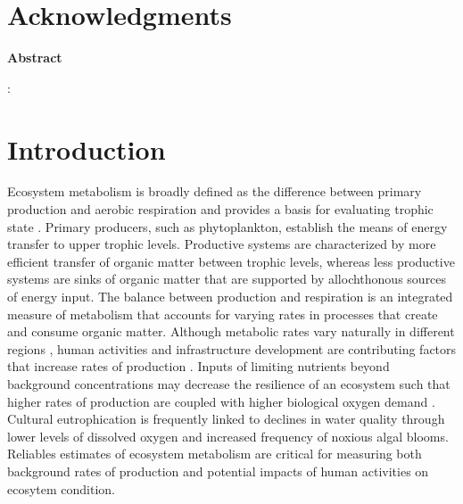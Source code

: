 \documentclass[letterpaper,12pt,oneside]{article}\usepackage[]{graphicx}\usepackage[]{color}
\begin{document}
\raggedbottom
\raggedright
{}
\setlength{\parindent}{0.5in}
\renewcommand\refname{References \vspace{12pt}}



\section{Acknowledgments}

\centerline{{\bf Abstract}}
\begin{singlespace} \small
\noindent 

\normalsize
\end{singlespace}
:

\acresetall
\clearpage

\section{Introduction} \label{intro}

Ecosystem metabolism is broadly defined as the difference between primary production and aerobic respiration and provides a basis for evaluating trophic state \citep{Kemp12,Needoba12}.  Primary producers, such as phytoplankton, establish the means of energy transfer to upper trophic levels. Productive systems are characterized by more efficient transfer of organic matter between trophic levels, whereas less productive systems are sinks of organic matter that are supported by allochthonous sources of energy input.  The balance between production and respiration is an integrated measure of metabolism that accounts for varying rates in processes that create and consume organic matter.  Although metabolic rates vary naturally in different regions \citep{Caffrey04}, human activities and infrastructure development are contributing factors that increase rates of production \citep{Diaz08}.  Inputs of limiting nutrients beyond background concentrations may decrease the resilience of an ecosystem such that higher rates of production are coupled with higher biological oxygen demand \citep{Yin04,Kemp09}.  Cultural eutrophication is frequently linked to declines in water quality through lower levels of dissolved oxygen and increased frequency of noxious algal blooms.  Reliables estimates of ecosystem metabolism are critical for measuring both background rates of production and potential impacts of human activities on ecosytem condition.     
\end{document}
